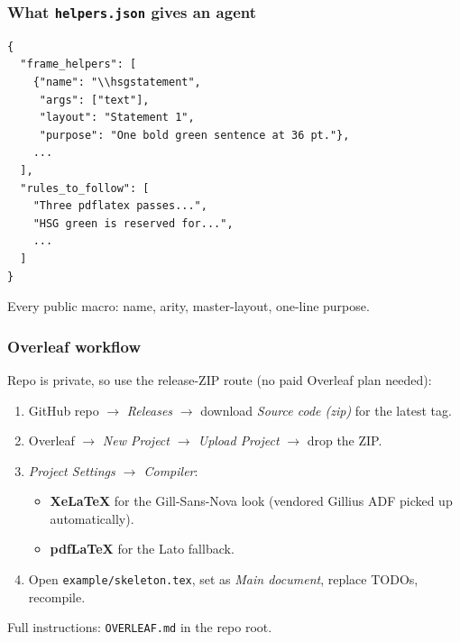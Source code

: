 \documentclass[aspectratio=169,xcolor=table]{beamer}
\begin{document}
\begin{frame}[t,fragile]
  \frametitle{What \texttt{helpers.json} gives an agent}

  \begin{lstlisting}
{
  "frame_helpers": [
    {"name": "\\hsgstatement",
     "args": ["text"],
     "layout": "Statement 1",
     "purpose": "One bold green sentence at 36 pt."},
    ...
  ],
  "rules_to_follow": [
    "Three pdflatex passes...",
    "HSG green is reserved for...",
    ...
  ]
}
  \end{lstlisting}

  Every public macro: name, arity, master-layout, one-line purpose.
\end{frame}

\begin{frame}[t,fragile]
  \frametitle{Overleaf workflow}

  Repo is private, so use the release-ZIP route (no paid Overleaf
  plan needed):

  \begin{enumerate}
    \setlength\itemsep{0.2em}
    \item GitHub repo $\rightarrow$ \emph{Releases} $\rightarrow$
          download \emph{Source code (zip)} for the latest tag.
    \item Overleaf $\rightarrow$ \emph{New Project $\rightarrow$ Upload
          Project} $\rightarrow$ drop the ZIP.
    \item \emph{Project Settings $\rightarrow$ Compiler}:
          \begin{itemize}\setlength\itemsep{0pt}
            \item \textbf{XeLaTeX} for the Gill-Sans-Nova look
                  (vendored Gillius ADF picked up automatically).
            \item \textbf{pdfLaTeX} for the Lato fallback.
          \end{itemize}
    \item Open \texttt{example/skeleton.tex}, set as
          \emph{Main document}, replace TODOs, recompile.
  \end{enumerate}

  Full instructions: \texttt{OVERLEAF.md} in the repo root.
\end{frame}

\end{document}
